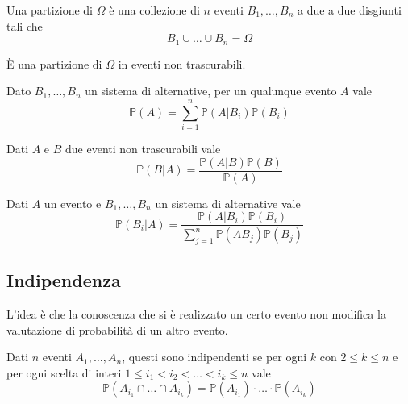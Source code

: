 \begin{definition}[Partizione]
	Una partizione di $\Omega$ è una collezione di $n$ eventi $B_1, \ldots, B_n$ a due a due disgiunti tali che
	\begin{equation}
		B_1 \cup \ldots \cup B_n = \Omega
	\end{equation}
\end{definition}
\begin{definition}
	È una partizione di $\Omega$ in eventi non trascurabili.
\end{definition}

\begin{theorem}
	Dato $B_1, \ldots, B_n$ un sistema di alternative, per un qualunque evento $A$ vale
	\begin{equation}
		\mathbb{P}(A) = \sum_{i=1}^{n} \mathbb{P}(A \vert B_i) \mathbb{P}(B_i)
	\end{equation}
\end{theorem}

\begin{definition}
	Dati $A$ e $B$ due eventi non trascurabili vale
	\begin{equation}
		\mathbb{P}(B \vert A) = \frac{\mathbb{P}(A \vert B)\mathbb{P}(B)}{\mathbb{P}(A)}
	\end{equation}
\end{definition}
\begin{definition}
	Dati $A$ un evento e $B_1, \ldots, B_n$ un sistema di alternative vale
	\begin{equation}
		\mathbb{P}(B_i \vert A) = \frac{\mathbb{P}(A \vert B_i)\mathbb{P}(B_i)}{\sum_{j=1}^{n} \mathbb{P}(A B_j)\mathbb{P}(B_j)}
	\end{equation}
\end{definition}

\subsection{Indipendenza}
L'idea è che la conoscenza che si è realizzato un certo evento non modifica la valutazione di probabilità di un altro evento.
\begin{definition}
	Dati $n$ eventi $A_1, \ldots, A_n$, questi sono indipendenti se per ogni $k$ con $2 \leq k \leq n$ e per ogni scelta di interi $1 \leq i_1 < i_2< \ldots < i_k \leq n$ vale
	\begin{equation}
		\mathbb{P}(A_{i_1} \cap \ldots \cap A_{i_k}) = \mathbb{P}(A_{i_1}) \cdot  \ldots \cdot \mathbb{P}(A_{i_k})
	\end{equation}
\end{definition}

